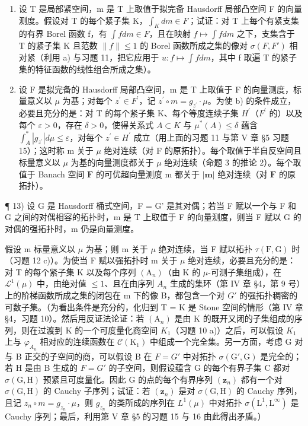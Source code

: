 \begin{enumerate}
\def\labelenumi{\alph{enumi})}
\setcounter{enumi}{1}
\item
  设 T 是局部紧空间，m 是 T 上取值于拟完备 Hausdorff 局部凸空间 F 的向量测度。假设对 T 的每个紧子集 K，\(\int_{K} dm \in F\)；试证：对 T 上每个有紧支集的有界 Borel 函数 f，有 \(\int f dm \in F\)，且在映射 \(f \mapsto \int f dm\) 之下，支集含于 T 的紧子集 K 且范数 \(\|f\| \leqslant 1\) 的 Borel 函数所成之集的像对 \(\sigma(F, F')\) 相对紧（利用 a) 与习题 11，把它应用于 \(u : f \mapsto \int f dm\)，其中 f 取遍 T 的紧子集的特征函数的线性组合所成之集）。
\item
  设 F 是拟完备的 Hausdorff 局部凸空间，m 是 T 上取值于 F 的向量测度，标量意义以 \(\mu\) 为基；对每个 \(z^{\prime} \in F^{\prime}\)，记 \(z^{\prime} \circ m = g_{z^{\prime}} \cdot \mu\)。为使 b) 的条件成立，必要且充分的是：对 T 的每个紧子集 K、每个等度连续子集 \(H^{\prime}\)（\(F^{\prime}\) 的）以及每个 \(\varepsilon > 0\)，存在 \(\delta > 0\)，使得关系式 \(A \subset K\) 与 \(\mu^{*}(A) \leqslant \delta\) 蕴含 \(\int_{A}^{*}|g_{z^{\prime}}| d\mu \leqslant \varepsilon\)，对每个 \(z^{\prime} \in H^{\prime}\) 成立（用上面的习题 11 与第 V 章 §5 习题 15）；这时称 m 关于 \(\mu\) 绝对连续（对 F 的原拓扑）。每个取值于半自反空间且标量意义以 \(\mu\) 为基的向量测度都关于 \(\mu\) 绝对连续（命题 3 的推论 2）。每个取值于 Banach 空间 \(\mathbf{F}\) 的可优超向量测度 m 都关于 \(|\mathbf{m}|\) 绝对连续（对 \(\mathbf{F}\) 的原拓扑）。
\end{enumerate}

¶ 13) 设 G 是 Hausdorff 桶式空间，F = G' 是其对偶；若当 F 赋以一个与 F 和 G 之间的对偶相容的拓扑时，m 是 T 上取值于 F 的向量测度，则当 F 赋以 G 的对偶的强拓扑时，m 仍是向量测度。

假设 m 标量意义以 \(\mu\) 为基；则 m 关于 \(\mu\) 绝对连续，当 F 赋以拓扑 \(\tau(\mathrm{F},\mathrm{G})\) 时（习题 12 c)）。为使当 F 赋以强拓扑时 m 关于 \(\mu\) 绝对连续，必要且充分的是：对 T 的每个紧子集 K 以及每个序列 \((\mathrm{A}_{n})\)（由 K 的 \(\mu\)-可测子集组成），在 \(\mathcal{L}^{1}(\mu)\) 中，由绝对值 \(\leqslant1\)、且在由序列 \(A_{n}\) 生成的集环（第 IV 章 §4，第 9 号）上的阶梯函数所成之集的闭包在 m 下的像 B，都包含一个对 \(G'\) 的强拓扑稠密的可数子集。（为看出条件是充分的，化归到 T = K 是 Stone 空间的情形（第 IV 章 §4，习题 10）。然后用反证法论证：若 \((\mathrm{A}_{n})\) 是由 K 的既开又闭的子集组成的序列，则在过渡到 K 的一个可度量化商空间 \(K_{1}\)（习题 10 a)）之后，可以假设 \(K_{1}\) 上与 \(\varphi_{A_{n}}\) 相对应的连续函数在 \(\mathcal{C}(\mathrm{K}_{1})\) 中组成一个完全集。另一方面，考虑 G 对与 B 正交的子空间的商，可以假设 B 在 \(F = G'\) 中对拓扑 \(\sigma(\mathrm{G}',\mathrm{G})\) 是完全的；若 H 是由 B 生成的 \(F = G'\) 的子空间，则假设蕴含 G 的每个有界子集 C 都对 \(\sigma(\mathrm{G},\mathrm{H})\) 预紧且可度量化。因此 G 的点的每个有界序列 \((\mathbf{z}_{n})\) 都有一个对 \(\sigma(\mathrm{G},\mathrm{H})\) 的 Cauchy 子序列；试证：若 \((\mathbf{z}_{n})\) 是对 \(\sigma(\mathrm{G},\mathrm{H})\) 的 Cauchy 序列，且记 \(z_{n} \circ m = g_{z_{n}} \cdot \mu\)，则 \(g_{z_{n}}\) 的类所成的序列在 \(L^{1}(\mu)\) 中对拓扑 \(\sigma(\mathrm{L}^{1},\mathrm{L}^{\infty})\) 是 Cauchy 序列；最后，利用第 V 章 §5 的习题 15 与 16 由此得出矛盾。）

